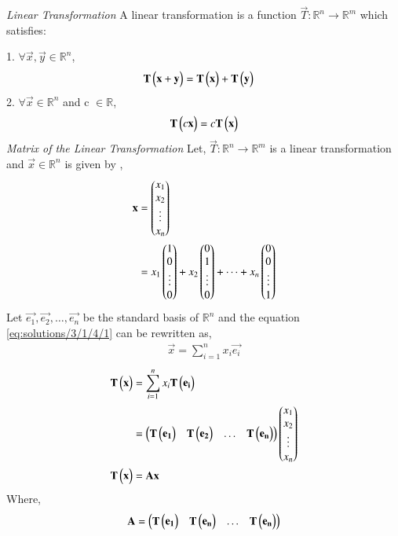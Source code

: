 {\em Linear Transformation}
 A linear transformation is a function $\vec{T} :\mathbb{R}^n \rightarrow  \mathbb{R}^m$ which satisfies:
 
 1. $\forall \vec{x},\vec{y} \in \mathbb{R}^n$,
 \begin{align}
     \mathbf{T}\begin{pmatrix}\mathbf{x}+\mathbf{y}\end{pmatrix}&=\mathbf{T}\begin{pmatrix}\mathbf{x}\end{pmatrix}+\mathbf{T}\begin{pmatrix}\mathbf{y}\end{pmatrix} 
 \end{align}
 2. $\forall \vec{x}\in \mathbb{R}^n$ and c $\in \mathbb{R}$,
 \begin{align}
     \mathbf{T}\begin{pmatrix}c\mathbf{x}\end{pmatrix}=c\mathbf{T}\begin{pmatrix}\mathbf{x}\end{pmatrix}
 \end{align}
{\em Matrix of the Linear Transformation}
Let,
$\vec{T} :\mathbb{R}^n \rightarrow  \mathbb{R}^m$ is a linear transformation and $\vec{x} \in \mathbb{R}^n$ is given by ,
\begin{align}
    \mathbf{x}&=\begin{pmatrix}x_1\\x_2\\\vdots\\x_n\end{pmatrix}\\
    &=x_1\begin{pmatrix}1\\0\\\vdots\\0\end{pmatrix}+x_2\begin{pmatrix}0\\1\\\vdots\\0\end{pmatrix}+\dots+x_n\begin{pmatrix}0\\0\\\vdots\\1\end{pmatrix}\label{eq:solutions/3/1/4/1}
\end{align}
Let $\vec{e_1},\vec{e_2},\dots,\vec{e_n}$ be the standard basis of $\mathbb{R}^n$ and the equation \eqref{eq:solutions/3/1/4/1} can be rewritten as,
\begin{align}
    \vec{x}=\sum_{i=1}^{n} x_i\vec{e_i}
\end{align}
\begin{align}
    \mathbf{T}\begin{pmatrix}\mathbf{x}\end{pmatrix}&=\sum_{i=1}^{n} x_i\mathbf{T}\begin{pmatrix}\mathbf{e_i}\end{pmatrix}\\
    &=\begin{pmatrix}\mathbf{T}\begin{pmatrix}\mathbf{e_1}\end{pmatrix} &\mathbf{T}\begin{pmatrix}\mathbf{e_2}\end{pmatrix}& \dots &\mathbf{T}\begin{pmatrix}\mathbf{e_n}\end{pmatrix}\end{pmatrix}\begin{pmatrix}x_1\\x_2\\\vdots\\x_n\end{pmatrix}\\
   \mathbf{T}\begin{pmatrix}\mathbf{x}\end{pmatrix} &=\mathbf{A}\mathbf{x}\label{eq:solutions/3/1/4/ax}
\end{align}
Where,
\begin{align}
    \mathbf{A}=\begin{pmatrix}\mathbf{T}\begin{pmatrix}\mathbf{e_1}\end{pmatrix} &\mathbf{T}\begin{pmatrix}\mathbf{e_n}\end{pmatrix}& \dots &\mathbf{T}\begin{pmatrix}\mathbf{e_n}\end{pmatrix}\end{pmatrix}
\end{align}
